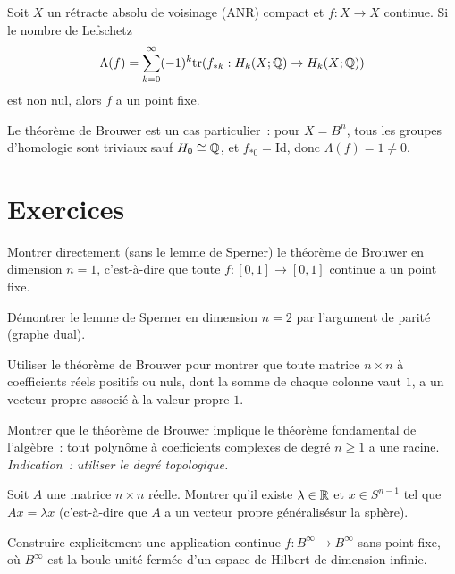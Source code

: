 \begin{theoreme}[Lefschetz]
Soit $X$ un r\'etracte absolu de voisinage (ANR) compact et $f : X \to X$
continue. Si le nombre de Lefschetz
\[
    \Lambda(f) = \sum_{k=0}^{\infty} (-1)^k \mathrm{tr}(f_{*k} : H_k(X; \mathbb{Q}) \to H_k(X; \mathbb{Q}))
\]
est non nul, alors $f$ a un point fixe.
\end{theoreme}

\begin{remarque}
Le th\'eor\`eme de Brouwer est un cas particulier~: pour $X = B^n$, tous les
groupes d'homologie sont triviaux sauf $H_0 \cong \mathbb{Q}$, et $f_{*0} = \mathrm{Id}$,
donc $\Lambda(f) = 1 \neq 0$.
\end{remarque}

\section{Exercices}

\begin{exercice}
Montrer directement (sans le lemme de Sperner) le th\'eor\`eme de Brouwer en
dimension $n = 1$, c'est-\`a-dire que toute $f : [0,1] \to [0,1]$ continue a
un point fixe.
\end{exercice}

\begin{exercice}
D\'emontrer le lemme de Sperner en dimension $n = 2$ par l'argument de parit\'e
(graphe dual).
\end{exercice}

\begin{exercice}
Utiliser le th\'eor\`eme de Brouwer pour montrer que toute matrice $n \times n$
\`a coefficients r\'eels positifs ou nuls, dont la somme de chaque colonne vaut $1$,
a un vecteur propre associ\'e \`a la valeur propre $1$.
\end{exercice}

\begin{exercice}
Montrer que le th\'eor\`eme de Brouwer implique le th\'eor\`eme fondamental de
l'alg\`ebre~: tout polyn\^ome \`a coefficients complexes de degr\'e $n \geq 1$ a
une racine.
\textit{Indication~: utiliser le degr\'e topologique.}
\end{exercice}

\begin{exercice}
Soit $A$ une matrice $n \times n$ r\'eelle. Montrer qu'il existe $\lambda \in \mathbb{R}$
et $x \in S^{n-1}$ tel que $Ax = \lambda x$ (c'est-\`a-dire que $A$ a un
\og{}vecteur propre g\'en\'eralis\'e\fg sur la sph\`ere).
\end{exercice}

\begin{exercice}
Construire explicitement une application continue $f : B^\infty \to B^\infty$
sans point fixe, o\`u $B^\infty$ est la boule unit\'e ferm\'ee d'un espace de
Hilbert de dimension infinie.
\end{exercice}
